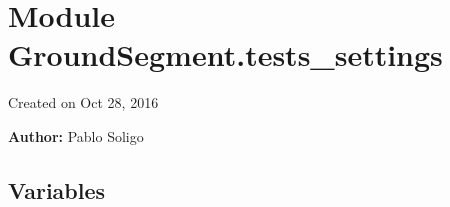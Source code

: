 %
%
%


\section{Module GroundSegment.tests\_settings}

    \label{GroundSegment:tests_settings}
Created on Oct 28, 2016

\textbf{Author:} Pablo Soligo





  \subsection{Variables}

